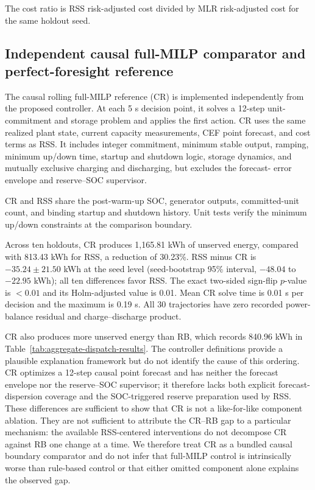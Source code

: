 The cost ratio is RSS risk-adjusted cost divided by MLR risk-adjusted cost
for the same holdout seed.

\subsection{Independent causal full-MILP comparator and perfect-foresight reference}
\label{independent-full-milp-oracle-reference}

The causal rolling full-MILP reference (CR) is implemented independently from
the proposed controller. At each 5 s decision point, it solves a 12-step unit-
commitment and storage problem and applies the first action. CR uses the same
realized plant state, current capacity measurements, CEF point forecast, and
cost terms as RSS. It includes integer commitment, minimum stable output,
ramping, minimum up/down time, startup and shutdown logic, storage dynamics,
and mutually exclusive charging and discharging, but excludes the forecast-
error envelope and reserve--SOC supervisor.

CR and RSS share the post-warm-up SOC, generator outputs, committed-unit count,
and binding startup and shutdown history. Unit tests verify the minimum up/down
constraints at the comparison boundary.

Across ten holdouts, CR produces 1,165.81 kWh of unserved energy, compared with
813.43 kWh for RSS, a reduction of 30.23\%. RSS minus CR is
$-35.24\pm21.50$ kWh at the seed level (seed-bootstrap 95\% interval,
$-48.04$ to $-22.95$ kWh); all ten differences favor RSS. The exact two-sided
sign-flip $p$-value is $<0.01$ and its Holm-adjusted value is 0.01. Mean CR solve
time is 0.01 s per decision and the maximum is 0.19 s. All 30 trajectories have
zero recorded power-balance residual and charge--discharge product.

CR also produces more unserved energy than RB, which records 840.96 kWh in
Table~\ref{tab:aggregate-dispatch-results}. The controller definitions provide a plausible explanation framework
but do not identify the cause of this ordering. CR optimizes a 12-step causal
point forecast and has neither the forecast envelope nor the reserve--SOC
supervisor; it therefore lacks both explicit forecast-dispersion coverage and
the SOC-triggered reserve preparation used by RSS. These differences are
sufficient to show that CR is not a like-for-like component ablation. They are
not sufficient to attribute the CR--RB gap to a particular mechanism: the
available RSS-centered interventions do not decompose CR against RB one change
at a time. We therefore treat CR as a bundled causal boundary comparator and do
not infer that full-MILP control is intrinsically worse than rule-based control
or that either omitted component alone explains the observed gap.

